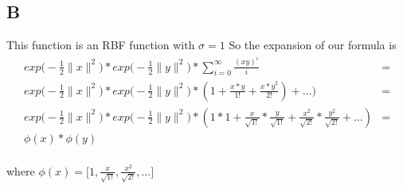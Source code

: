 \subsection{B}
This function is an RBF function with $\sigma = 1$
So the expansion of our formula is 
\begin{align*}
exp\Big( -\frac{1}{2} \lVert{x}\rVert^2\Big) * exp\Big( -\frac{1}{2} \lVert{y}\rVert^2\Big) * \sum_{i=0}^{\infty} \frac{(xy)^i}{i} &= \\
exp\Big( -\frac{1}{2} \lVert{x}\rVert^2\Big) * exp\Big( -\frac{1}{2} \lVert{y}\rVert^2\Big) * (1 + \frac{x*y}{1!} + \frac{{x*y}^2}{2!}) + \ldots) &= \\
exp\Big( -\frac{1}{2} \lVert{x}\rVert^2\Big) * exp\Big( -\frac{1}{2} \lVert{y}\rVert^2\Big) * (1*1 + \frac{x}{\sqrt{1!}}* \frac{y}{\sqrt{1!}} +  \frac{x^2}{\sqrt{2!}}* \frac{y^2}{\sqrt{2!}} + \ldots) &= \\
\phi(x) * \phi(y)\\
\end{align*}

where $\phi(x) = \Big[ 1,\frac{x}{\sqrt{1!}},\frac{x^2}{\sqrt{2!}}, \ldots \Big]$
